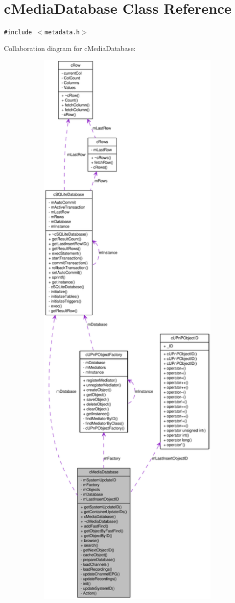 \hypertarget{classcMediaDatabase}{
\section{cMediaDatabase Class Reference}
\label{classcMediaDatabase}
}
{\tt \#include $<$metadata.h$>$}

Collaboration diagram for cMediaDatabase:\nopagebreak
\begin{figure}[H]
\begin{center}
\leavevmode
\includegraphics[width=400pt]{classcMediaDatabase__coll__graph}
\end{center}
\end{figure}

